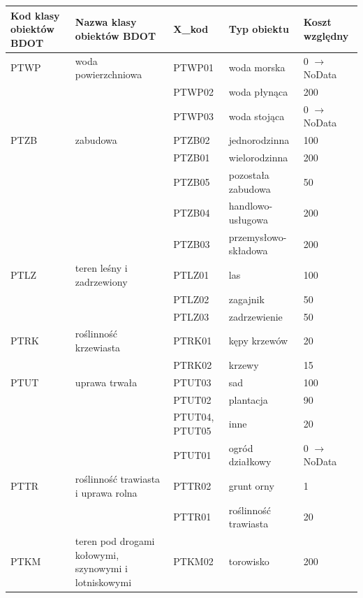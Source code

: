 \documentclass{article}
\begin{document}
\begin{table}[ht]
    \centering %
    \renewcommand{\arraystretch}{1.2} %
    \begin{tabular}{|p{2cm}|p{4.5cm}|p{2cm}|p{3cm}|p{2cm}|}
    \hline
    \textbf{Kod klasy obiektów BDOT} & \textbf{Nazwa klasy obiektów BDOT} & \textbf{X\_kod} & \textbf{Typ obiektu} & \textbf{Koszt względny} \\
    \hline
    PTWP & woda powierzchniowa & PTWP01 & woda morska & 0 $\rightarrow$ NoData \\ \cline{3-5}
    & & PTWP02 & woda płynąca & 200 \\ \cline{3-5}
    & & PTWP03 & woda stojąca & 0 $\rightarrow$ NoData \\ 
    \hline
    PTZB & zabudowa & PTZB02 & jednorodzinna & 100 \\ \cline{3-5}
    & & PTZB01 & wielorodzinna & 200 \\ \cline{3-5}
    & & PTZB05 & pozostała \newline zabudowa & 50 \\ \cline{3-5}
    & & PTZB04 & handlowo-usługowa & 200 \\ \cline{3-5}
    & & PTZB03 & przemysłowo-składowa & 200 \\ 
    \hline
    PTLZ & teren leśny i zadrzewiony & PTLZ01 & las & 100 \\ \cline{3-5}
    & & PTLZ02 & zagajnik & 50 \\ \cline{3-5}
    & & PTLZ03 & zadrzewienie & 50 \\ 
    \hline
    PTRK & roślinność krzewiasta & PTRK01 & kępy krzewów & 20 \\ \cline{3-5}
    & & PTRK02 & krzewy & 15 \\ 
    \hline
    PTUT & uprawa trwała & PTUT03 & sad & 100 \\ \cline{3-5}
    & & PTUT02 & plantacja & 90 \\ \cline{3-5}
    & & PTUT04, PTUT05 & inne & 20 \\ \cline{3-5}
    & & PTUT01 & ogród działkowy & 0 $\rightarrow$ NoData \\ 
    \hline
    PTTR & roślinność trawiasta i uprawa rolna & PTTR02 & grunt orny & 1 \\ \cline{3-5}
    & & PTTR01 & roślinność \newline trawiasta & 20 \\ 
    \hline
    PTKM & teren pod drogami kołowymi, szynowymi i lotniskowymi & PTKM02 & torowisko & 200 \\ \cline{3-5}

\end{tabular}
\end{table}
\end{document}
